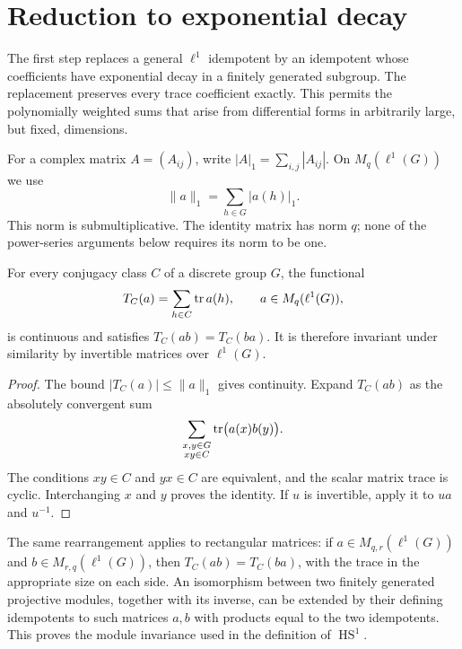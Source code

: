 \section{Reduction to exponential decay}\label{sec:reduction}

The first step replaces a general $\ell^1$ idempotent by an idempotent
whose coefficients have exponential decay in a finitely generated
subgroup. The replacement preserves every trace coefficient exactly.
This permits the polynomially weighted sums that arise from differential
forms in arbitrarily large, but fixed, dimensions.

For a complex matrix $A=(A_{ij})$, write $|A|_1=\sum_{i,j}|A_{ij}|$.
On $M_q(\ell^1(G))$ we use
\[
 \|a\|_1=\sum_{h\in G}|a(h)|_1.
\]
This norm is submultiplicative. The identity matrix has norm $q$;
none of the power-series arguments below requires its norm to be one.

\begin{lemma}[Traciality]\label{red:trace}
For every conjugacy class $C$ of a discrete group $G$, the functional
\[
 T_C(a)=\sum_{h\in C}\operatorname{tr} a(h),\qquad a\in M_q(\ell^1(G)),
\]
is continuous and satisfies $T_C(ab)=T_C(ba)$. It is therefore invariant
under similarity by invertible matrices over $\ell^1(G)$.
\end{lemma}
\begin{proof}
The bound $|T_C(a)|\le\|a\|_1$ gives continuity. Expand $T_C(ab)$
as the absolutely convergent sum
\[
 \sum_{\substack{x,y\in G\\xy\in C}}\operatorname{tr}\bigl(a(x)b(y)\bigr).
\]
The conditions $xy\in C$ and $yx\in C$ are equivalent, and the scalar
matrix trace is cyclic. Interchanging $x$ and $y$ proves the identity.
If $u$ is invertible, apply it to $ua$ and $u^{-1}$.
\end{proof}

The same rearrangement applies to rectangular matrices: if
$a\in M_{q,r}(\ell^1(G))$ and $b\in M_{r,q}(\ell^1(G))$, then
$T_C(ab)=T_C(ba)$, with the trace in the appropriate size on each side.
An isomorphism between two finitely generated projective modules,
together with its inverse, can be extended by their defining
idempotents to such matrices $a,b$ with products equal to the two
idempotents. This proves the module invariance used in the definition
of $\operatorname{HS}^1$.

